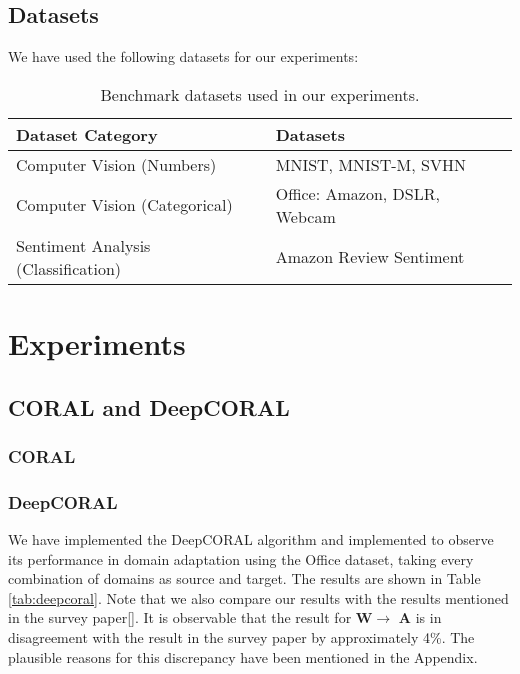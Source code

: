 \documentclass{article}
\begin{document}
\subsection{Datasets}
We have used the following datasets for our experiments:
\begin{table}[h]
  \centering
  \caption{Benchmark datasets used in our experiments.}
  \label{tab:datasets}
  \begin{tabular}{ll}
      \toprule
      \textbf{Dataset Category} & \textbf{Datasets} \\
      \midrule
      Computer Vision (Numbers)     & MNIST, MNIST-M, SVHN \\
      Computer Vision (Categorical) & Office: Amazon, DSLR, Webcam \\
      Sentiment Analysis (Classification)  & Amazon Review Sentiment \\
      \bottomrule
  \end{tabular}
\end{table}


\section{Experiments}
\subsection{CORAL and DeepCORAL}
\subsubsection{CORAL}

\subsubsection{DeepCORAL}
We have implemented the DeepCORAL algorithm and implemented to observe its performance in domain adaptation using the Office dataset, taking every combination of domains as source and target. The results are shown in Table \ref{tab:deepcoral}. Note that we also compare our results with the results mentioned in the survey paper[]. It is observable that the result for \textbf{W}$\rightarrow$ \textbf{A} is in disagreement with the result in the survey paper by approximately 4\%. The plausible reasons for this discrepancy have been mentioned in the Appendix.
 
\end{document}
